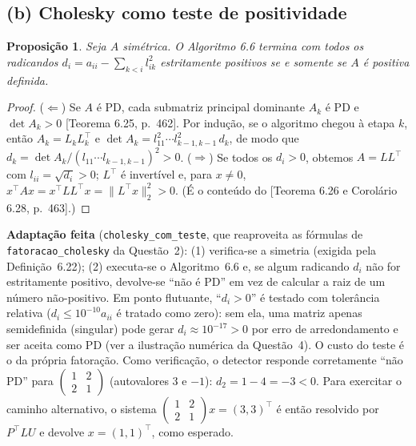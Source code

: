 \documentclass{article}
\newcommand{\T}{^{\top}}
\newcommand{\burden}[1]{\textsf{\footnotesize[#1]}}
\newtheorem{proposicao}{Proposição}
\theoremstyle{remark}
\begin{document}
\subsection*{(b) Cholesky como teste de positividade}
\begin{proposicao}\label{prop:chol}
Seja $A$ simétrica. O Algoritmo 6.6 termina com todos os radicandos
$d_i=a_{ii}-\sum_{k<i}l_{ik}^2$ estritamente positivos se e somente se $A$ é positiva definida.
\end{proposicao}
\begin{proof}
($\Leftarrow$) Se $A$ é PD, cada submatriz principal dominante $A_k$ é PD e $\det A_k>0$ \burden{Teorema 6.25, p.~462}.
Por indução, se o algoritmo chegou à etapa $k$, então $A_k=L_kL_k\T$ e
$\det A_k=l_{11}^2\cdots l_{k-1,k-1}^2\,d_k$, de modo que $d_k=\det A_k/(l_{11}\cdots l_{k-1,k-1})^2>0$.
($\Rightarrow$) Se todos os $d_i>0$, obtemos $A=LL\T$ com $l_{ii}=\sqrt{d_i}>0$; $L\T$ é invertível e, para $x\neq0$,
$x\T Ax=x\T LL\T x=\|L\T x\|_2^2>0$. (É o conteúdo do \burden{Teorema 6.26 e Corolário 6.28, p.~463}.)
\end{proof}
\begin{sloppypar}\noindent \textbf{Adaptação feita} (\texttt{cholesky\_com\_teste}, que reaproveita as fórmulas de
\texttt{fatoracao\_cholesky} da Questão~2): (1) verifica-se a simetria (exigida pela Definição~6.22); (2) executa-se o
Algoritmo~6.6 e, se algum radicando $d_i$ não for estritamente positivo, devolve-se ``não é PD'' em vez de calcular a raiz
de um número não-positivo. Em ponto flutuante, ``$d_i>0$'' é testado com tolerância relativa ($d_i\le10^{-10}a_{ii}$ é tratado
como zero): sem ela, uma matriz apenas semidefinida (singular) pode gerar $d_i\approx10^{-17}>0$ por erro de arredondamento e ser
aceita como PD (ver a ilustração numérica da Questão~4). O custo do teste é o da própria fatoração. Como verificação, o detector responde
corretamente ``não PD'' para $\left(\begin{smallmatrix}1&2\\2&1\end{smallmatrix}\right)$ (autovalores $3$ e $-1$): $d_2=1-4=-3<0$.
Para exercitar o caminho alternativo, o sistema $\left(\begin{smallmatrix}1&2\\2&1\end{smallmatrix}\right)x=(3,3)\T$ é então resolvido
por $P\T LU$ e devolve $x=(1,1)\T$, como esperado.
\end{sloppypar}
\end{document}
